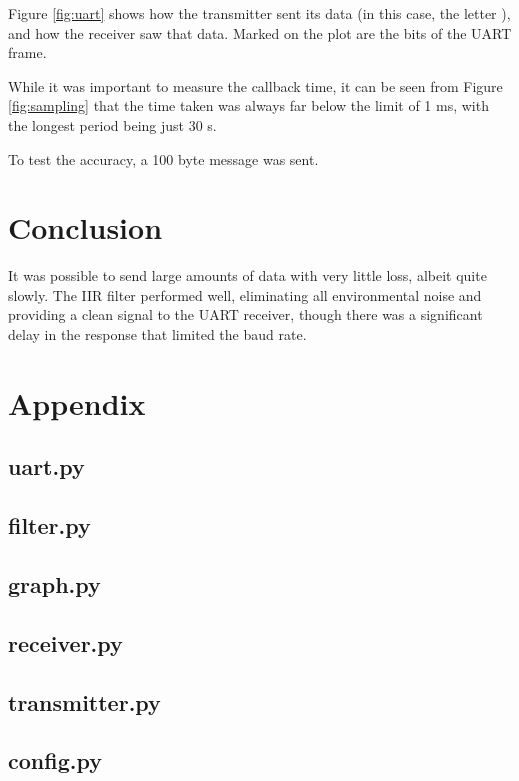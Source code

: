 \documentclass{article}
\begin{document}
\begin{multicols}{2}
Figure \ref{fig:uart} shows how the transmitter sent its data (in this case, the letter ), and how the receiver saw that data. Marked on the plot are the bits of the UART frame.

While it was important to measure the callback time, it can be seen from Figure \ref{fig:sampling} that the time taken was always far below the limit of 1 ms, with the longest period being just 30 \textmu s.

To test the accuracy, a 100 byte message was sent.

\section{Conclusion}
It was possible to send large amounts of data with very little loss, albeit quite slowly. The IIR filter performed well, eliminating all environmental noise and providing a clean signal to the UART receiver, though there was a significant delay in the response that limited the baud rate.

\end{multicols}
\pagebreak

\section{Appendix}

\subsection{uart.py}


\subsection{filter.py}


\subsection{graph.py}


\subsection{receiver.py}


\subsection{transmitter.py}


\subsection{config.py}

\end{document}
